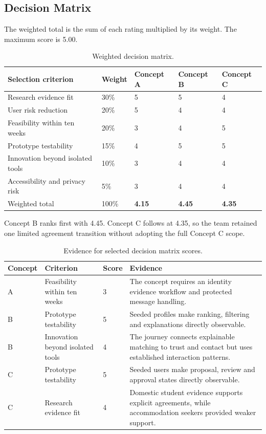 \documentclass[11pt,a4paper]{article}
\begin{document}
\subsection{Decision Matrix}

The weighted total is the sum of each rating multiplied by its weight. The maximum score is 5.00.

\begin{table}[H]
    \centering
    \small
    \caption{Weighted decision matrix.}
    \begin{tabularx}{\textwidth}{@{}Y L{1.5cm}L{1.7cm}L{1.7cm}L{1.7cm}@{}}
        \toprule
        Selection criterion & Weight & Concept A & Concept B & Concept C\\
        \midrule
        Research evidence fit & 30\% & 5 & 5 & 4\\
        User risk reduction & 20\% & 5 & 4 & 4\\
        Feasibility within ten weeks & 20\% & 3 & 4 & 5\\
        Prototype testability & 15\% & 4 & 5 & 5\\
        Innovation beyond isolated tools & 10\% & 3 & 4 & 4\\
        Accessibility and privacy risk & 5\% & 3 & 4 & 4\\
        \midrule
        Weighted total & 100\% & \textbf{4.15} & \textbf{4.45} & \textbf{4.35}\\
        \bottomrule
    \end{tabularx}
    \label{tabconceptselection}
\end{table}

Concept B ranks first with 4.45. Concept C follows at 4.35, so the team retained one limited agreement transition without adopting the full Concept C scope.

\begin{table}[H]
    \centering
    \small
    \caption{Evidence for selected decision matrix scores.}
    \begin{tabularx}{\textwidth}{@{}L{1.5cm}L{3.3cm}L{1.2cm}Y@{}}
        \toprule
        Concept & Criterion & Score & Evidence\\
        \midrule
        A & Feasibility within ten weeks & 3 & The concept requires an identity evidence workflow and protected message handling.\\
        B & Prototype testability & 5 & Seeded profiles make ranking, filtering and explanations directly observable.\\
        B & Innovation beyond isolated tools & 4 & The journey connects explainable matching to trust and contact but uses established interaction patterns.\\
        C & Prototype testability & 5 & Seeded users make proposal, review and approval states directly observable.\\
        C & Research evidence fit & 4 & Domestic student evidence supports explicit agreements, while accommodation seekers provided weaker support.\\
        \bottomrule
    \end{tabularx}
    \label{tabscoringrationale}
\end{table}
\end{document}
